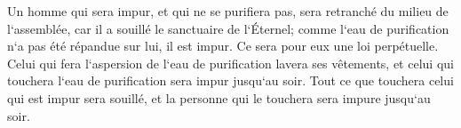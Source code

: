 \verse Un homme qui sera impur, et qui ne se purifiera pas, sera retranché du milieu de l`assemblée, car il a souillé le sanctuaire de l`Éternel; comme l`eau de purification n`a pas été répandue sur lui, il est impur. 
\verse Ce sera pour eux une loi perpétuelle. Celui qui fera l`aspersion de l`eau de purification lavera ses vêtements, et celui qui touchera l`eau de purification sera impur jusqu`au soir. 
\verse Tout ce que touchera celui qui est impur sera souillé, et la personne qui le touchera sera impure jusqu`au soir. 

\chapter{}

